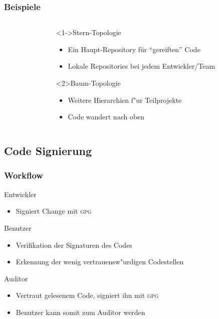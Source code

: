 \documentclass[german]{beamer}
\newcommand{\GPG}{\textsc{gpg}}
\begin{document}
\begin{frame}
  \frametitle{Beispiele}
  \begin{columns}
    \begin{column}{0.5\textwidth}
      \begin{flushleft}
      \end{flushleft}
    \end{column}
    \begin{column}{0.5\textwidth}
      \begin{block}<1->{Stern-Topologie}
        \begin{itemize}
        \item Ein Haupt-Repository f\"ur "`gereiften"' Code
        \item Lokale Repositories bei jedem Entwickler/Team
        \end{itemize}
      \end{block}
      \begin{block}<2>{Baum-Topologie}
        \begin{itemize}
        \item Weitere Hierarchien f"ur Teilprojekte
        \item Code wandert nach oben
        \end{itemize}
      \end{block}
    \end{column}
  \end{columns}
\end{frame}

\subsection{Code Signierung}

\begin{frame}
  \frametitle{Workflow}
  \begin{block}{Entwickler}
    \begin{itemize}
      \item Signiert Change mit \GPG
    \end{itemize}
  \end{block}
  \begin{block}{Benutzer}
    \begin{itemize}
      \item Verifikation der Signaturen des Codes
      \item Erkennung der wenig vertrauensw"urdigen Codestellen
    \end{itemize}
  \end{block}
  \begin{block}{Auditor}
    \begin{itemize}
      \item Vertraut gelesenem Code, signiert ihn mit \GPG{}
      \item Benutzer kann somit zum Auditor werden
    \end{itemize}
  \end{block}
\end{frame}
\end{document}

